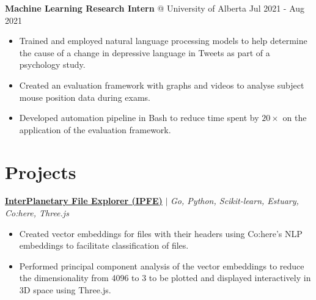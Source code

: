 \documentclass{article}
\makeatletter
\newcommand{\smallbullet}{\,\begin{picture}(-1,1)(-1,-3)\circle*{3}\end{picture}\ }
\newenvironment{resumeItem}
{
    \vspace{0.5em}
}
{
}
\newcommand{\projectHead}[3]{
    \textbf{#1} $\vert$ \textit{#2} \\[-1.2em]
}
\newcommand{\experienceHead}[4]{
    \textbf{#1} @ #2 \hfill #3 \\[-1.2em]
}
\newenvironment{resumeList}
{
    \begin{itemize}[label=\smallbullet]
}
{
    \end{itemize}
}
\makeatother
\begin{document}
\begin{resumeItem}
\experienceHead{Machine Learning Research Intern}{University of Alberta}{Jul 2021 - Aug 2021}{Online}
\begin{resumeList}
    \item Trained and employed natural language processing models to help determine the cause of a change in depressive language in Tweets as part of a psychology study.
    \item Created an evaluation framework with graphs and videos to analyse subject mouse position data during exams.
    \item Developed automation pipeline in Bash to reduce time spent by $20\times$ on the application of the evaluation framework.
\end{resumeList}
\end{resumeItem}



\section{Projects}

\begin{resumeItem}
\projectHead{\href{https://github.com/youssefsoli/IPFE}{InterPlanetary File Explorer (IPFE)}}{Go, Python, Scikit-learn, Estuary, Co:here, Three.js}{Jan 2023}
\begin{resumeList}
    \item Created vector embeddings for files with their headers using Co:here's NLP embeddings to facilitate classification of files.
    \item Performed principal component analysis of the vector embeddings to reduce the dimensionality from 4096 to 3 to be plotted and displayed interactively in 3D space using Three.js.
\end{resumeList}
\end{resumeItem}
\end{document}
